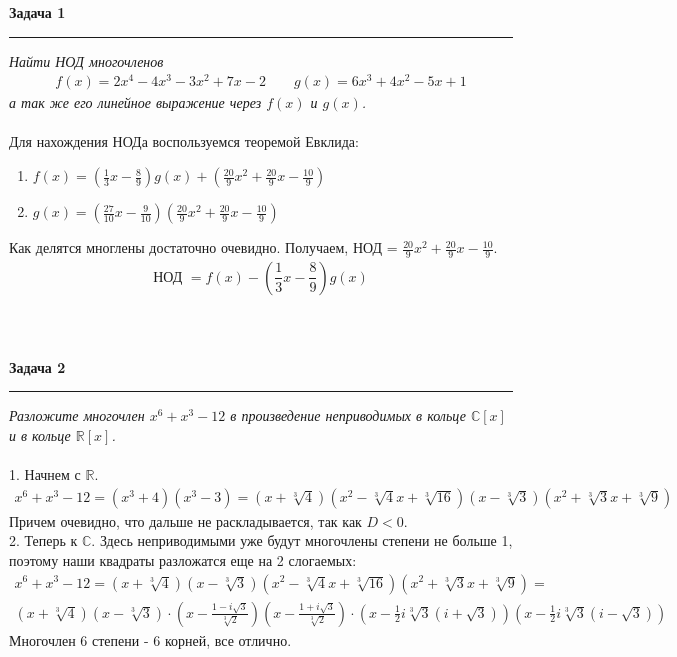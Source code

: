 \documentclass[a4paper,11pt]{article}
\begin{document}
\textbf{\large Задача 1}
\medskip\hrule\medskip
\textit{Найти НОД многочленов}
\begin{align*}
f(x) = 2x^4  - 4x^3 - 3x^2 + 7x - 2 \qquad
g(x) = 6x^3 + 4x^2 - 5x + 1
\end{align*}
\textit{а так же его линейное выражение через $ f(x) $ и $ g(x) $.} \\ \\
Для нахождения НОДа воспользуемся теоремой Евклида:
\begin{enumerate}
	\item $ f(x) = (\frac13 x - \frac89 )g(x) + (\frac{20}9 x^2 + \frac{20}9x - \frac{10}9 ) $
	\item $ g(x) = (\frac{27}{10}x - \frac9{10})(\frac{20}9 x^2 + \frac{20}9x - \frac{10}9 ) $
\end{enumerate}
Как делятся многлены достаточно очевидно. Получаем, НОД = $ \frac{20}9 x^2 + \frac{20}9x - \frac{10}9  $.
\begin{gather*}
	\text{НОД } =  f(x) - (\dfrac13 x - \dfrac89 )g(x)
\end{gather*}
\\ \\ \\








\textbf{\large Задача 2}
\medskip\hrule\medskip
\textit{Разложите многочлен $ x^6 + x^3 - 12 $ в произведение неприводимых в кольце $ \mathbb{C}[x] $ и в кольце $ \mathbb{R}[x] $.} \\ \\
1. Начнем с $ \mathbb{R} $.
\begin{gather*}
	x^6 + x^3 - 12 = (x^3 + 4)(x^3 - 3) = (x + \sqrt[3]{4})(x^2 - \sqrt[3]{4}x + \sqrt[3]{16})(x - \sqrt[3]{3})(x^2 + \sqrt[3]{3}x + \sqrt[3]{9}) 
\end{gather*}
Причем очевидно, что дальше не раскладывается, так как $ D < 0 $. \\[3pt]
2. Теперь к $ \mathbb{C} $. Здесь неприводимыми уже будут многочлены степени не больше 1, поэтому наши квадраты разложатся еще на 2 слогаемых:
\begin{gather*}
		x^6 + x^3 - 12 = (x + \sqrt[3]{4})(x - \sqrt[3]{3})(x^2 - \sqrt[3]{4}x + \sqrt[3]{16})(x^2 + \sqrt[3]{3}x + \sqrt[3]{9}) = \\[2pt]
		(x + \sqrt[3]{4})(x - \sqrt[3]{3}) \cdot (x - \frac{1 - i\sqrt{3}}{\sqrt[3]{2}}) (x - \frac{1 + i\sqrt{3}}{\sqrt[3]{2}}) \cdot (x - \frac12 i \sqrt[3]{3}(i + \sqrt{3}))(x - \frac12 i \sqrt[3]{3}(i - \sqrt{3}))
\end{gather*}
Многочлен 6 степени - 6 корней, все отлично.
\\ \\ \\
\end{document}
